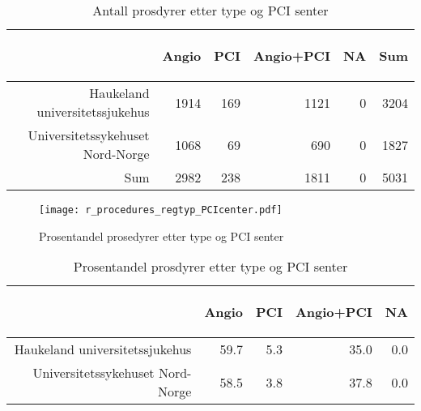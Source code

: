 \documentclass[norsk, a4paper]{report}
\begin{document}
\begin{tiny}
\begin{table}[ht]
\centering
\begin{tabular}{rrrrrr}
  \toprule
 & \begin{sideways} Angio \end{sideways} & \begin{sideways} PCI \end{sideways} & \begin{sideways} Angio+PCI \end{sideways} & \begin{sideways} NA \end{sideways} & \begin{sideways} Sum \end{sideways} \\ 
  \midrule
Haukeland universitetssjukehus & 1914 & 169 & 1121 & 0 & 3204 \\ 
  Universitetssykehuset Nord-Norge & 1068 & 69 & 690 & 0 & 1827 \\ 
  Sum & 2982 & 238 & 1811 & 0 & 5031 \\ 
   \bottomrule
\end{tabular}
\caption{Antall prosdyrer etter type og PCI senter} 
\end{table}\end{tiny}

\clearpage



\begin{figure}[ht]
  \centering
\texttt{[image: r\_procedures\_regtyp\_PCIcenter.pdf]}  \caption{Prosentandel prosedyrer etter type og PCI senter}
\end{figure}

\begin{tiny}
\begin{table}[ht]
\centering
\begin{tabular}{rrrrr}
  \toprule
 & \begin{sideways} Angio \end{sideways} & \begin{sideways} PCI \end{sideways} & \begin{sideways} Angio+PCI \end{sideways} & \begin{sideways} NA \end{sideways} \\ 
  \midrule
Haukeland universitetssjukehus & 59.7 & 5.3 & 35.0 & 0.0 \\ 
  Universitetssykehuset Nord-Norge & 58.5 & 3.8 & 37.8 & 0.0 \\ 
   \bottomrule
\end{tabular}
\caption{Prosentandel prosdyrer etter type og PCI senter} 
\end{table}\end{tiny}
\end{document}
